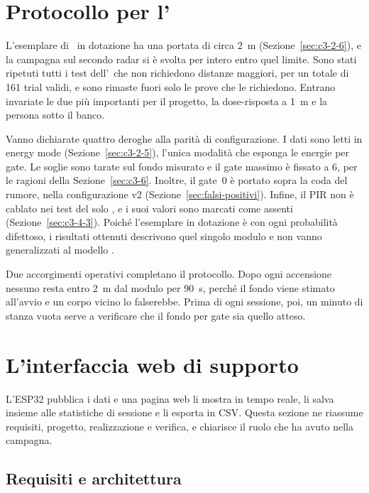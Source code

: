\section{Protocollo per l'\ldc{}}
\label{sec:protocollo-ld2420}

L'esemplare di \ldc\ in dotazione ha una portata di circa 2~m (Sezione~\ref{sec:c3-2-6}),
e la campagna sul secondo radar si è svolta per intero entro quel limite. Sono stati
ripetuti tutti i test dell'\ldb\ che non richiedono distanze maggiori, per un totale di 161
trial validi, e sono rimaste fuori solo le prove che le richiedono. Entrano invariate le due
più importanti per il progetto, la dose-risposta a 1~m e la persona sotto il banco.

Vanno dichiarate quattro deroghe alla parità di configurazione. I dati sono letti in
energy mode (Sezione~\ref{sec:c3-2-5}), l'unica modalità che esponga le energie per gate.
Le soglie sono tarate sul fondo misurato e il gate massimo è fissato a 6, per le ragioni
della Sezione~\ref{sec:c3-6}. Inoltre, il gate~0 è portato sopra la coda del rumore, nella
configurazione v2 (Sezione~\ref{sec:falsi-positivi}). Infine, il PIR non è cablato nei
test del solo \ldc, e i suoi valori sono marcati come assenti (Sezione~\ref{sec:c3-4-3}).
Poiché l'esemplare in dotazione è con ogni probabilità difettoso, i risultati ottenuti descrivono quel singolo modulo e non vanno
generalizzati al modello \ldc.

Due accorgimenti operativi completano il protocollo. Dopo ogni accensione nessuno resta
entro 2~m dal modulo per 90~s, perché il fondo viene stimato all'avvio e un corpo vicino lo
falserebbe. Prima di ogni sessione, poi, un minuto di stanza vuota serve a verificare che
il fondo per gate sia quello atteso.

\section{L'interfaccia web di supporto}
\label{sec:webui}
\label{chap:webui}

L'ESP32 pubblica i dati e una pagina web li mostra in tempo reale, li salva insieme alle
statistiche di sessione e li esporta in CSV. Questa sezione ne riassume requisiti, progetto, realizzazione e verifica,
e chiarisce il ruolo che ha avuto nella campagna.

\subsection{Requisiti e architettura}
\label{sec:webui-requisiti}

